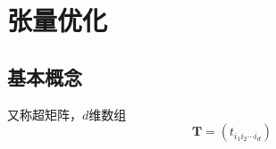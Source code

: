 \section{张量优化}
\subsection{基本概念}
\begin{definition}[$d$阶张量]
    又称超矩阵，$d$维数组
    \[
        \boldsymbol{T} = \left( t_{i_1i_2\cdots i_d} \right)
    \]
\end{definition}
